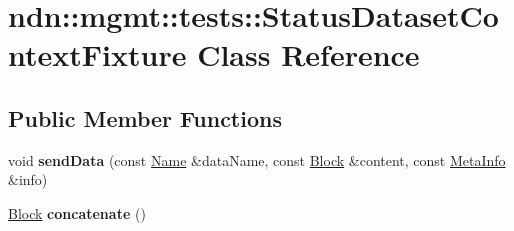 \hypertarget{classndn_1_1mgmt_1_1tests_1_1StatusDatasetContextFixture}{}\section{ndn\+:\+:mgmt\+:\+:tests\+:\+:Status\+Dataset\+Context\+Fixture Class Reference}
\label{classndn_1_1mgmt_1_1tests_1_1StatusDatasetContextFixture}
\subsection*{Public Member Functions}
\begin{DoxyCompactItemize}
\item 
void {\bfseries send\+Data} (const \hyperlink{classndn_1_1Name}{Name} \&data\+Name, const \hyperlink{classndn_1_1Block}{Block} \&content, const \hyperlink{classndn_1_1MetaInfo}{Meta\+Info} \&info)\hypertarget{classndn_1_1mgmt_1_1tests_1_1StatusDatasetContextFixture_a62caf5d003536224281abff4168868f8}{}\label{classndn_1_1mgmt_1_1tests_1_1StatusDatasetContextFixture_a62caf5d003536224281abff4168868f8}

\item 
\hyperlink{classndn_1_1Block}{Block} {\bfseries concatenate} ()\hypertarget{classndn_1_1mgmt_1_1tests_1_1StatusDatasetContextFixture_af77321c796c5e5d315994b8dacafed21}{}\label{classndn_1_1mgmt_1_1tests_1_1StatusDatasetContextFixture_af77321c796c5e5d315994b8dacafed21}

\end{DoxyCompactItemize}
